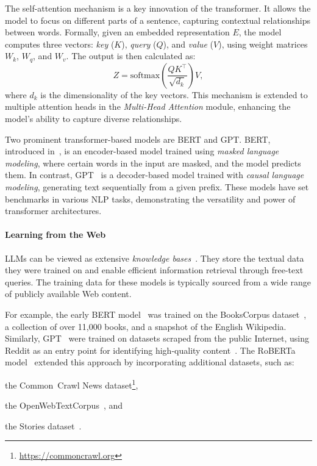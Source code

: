 The self-attention mechanism is a key innovation of the transformer.
%
It allows the model to focus on different parts of a sentence, capturing contextual relationships between words.
%
Formally, given an embedded representation \(E\), the model computes three vectors: \emph{key} (\(K\)), \emph{query} (\(Q\)), and \emph{value} (\(V\)), using weight matrices \(W_k\), \(W_q\), and \(W_v\).
%
The output is then calculated as:
%
\[
Z = \text{softmax}\left(\frac{QK^\top}{\sqrt{d_k}}\right)V,
\]
%
where \(d_k\) is the dimensionality of the key vectors.
%
This mechanism is extended to multiple attention heads in the \emph{Multi-Head Attention} module, enhancing the model's ability to capture diverse relationships.

Two prominent transformer-based models are BERT and GPT.
%
BERT, introduced in~\cite{DBLP:conf/naacl/DevlinCLT19}, is an encoder-based model trained using \emph{masked language modeling}, where certain words in the input are masked, and the model predicts them.
%
In contrast, GPT~\cite{radford2018improving} is a decoder-based model trained with \emph{causal language modeling}, generating text sequentially from a given prefix.
%
These models have set benchmarks in various \gls{NLP} tasks, demonstrating the versatility and power of transformer architectures.


\paragraph{Learning from the Web}

\glspl{LLM} can be viewed as extensive \emph{knowledge bases}~\cite{PetroniRRLBWM19}.
%
They store the textual data they were trained on and enable efficient information retrieval through free-text queries.
%
The training data for these models is typically sourced from a wide range of publicly available Web content.

%
For example, the early BERT model~\cite{DBLP:conf/naacl/DevlinCLT19} was trained on the BooksCorpus dataset~\cite{ZhuKZSUTF15}, a collection of over 11,000 books, and a snapshot of the English Wikipedia.
%
Similarly, GPT~\cite{gpt2,gpt3} were trained on datasets scraped from the public Internet, using Reddit as an entry point for identifying high-quality content~\cite{training-data-attack-2021}.
%
The RoBERTa model~\cite{roberta-2019} extended this approach by incorporating additional datasets, such as:
%
\begin{inlinelist}
    \item the Common~Crawl News dataset\footnote{\url{https://commoncrawl.org}},
    \item the OpenWebTextCorpus~\cite{Gokaslan2019OpenWeb}, and
    \item the Stories dataset~\cite{TrieuQuoc2018}.
\end{inlinelist}

